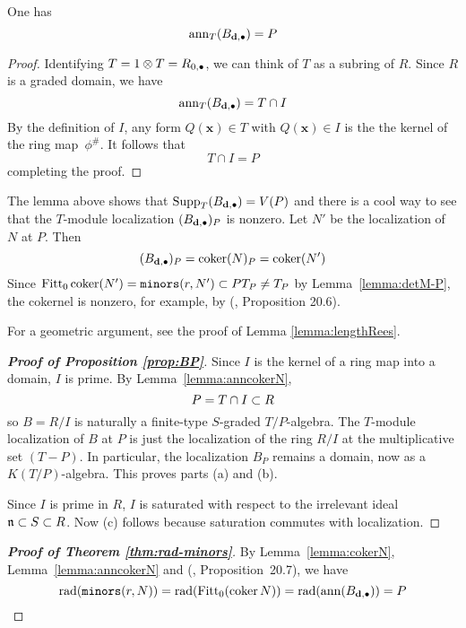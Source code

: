 \documentclass[fleqn,reqno]{amsart}
\begin{document}
\begin{lemma}
\label{lemma:anncokerN}
One has
\[
	\operatorname{ann}_T (B_{\mathbf d,\bullet})=P
\]
\end{lemma}

\begin{proof}
Identifying $T=1\otimes T=R_{0,\bullet}$, we can think of $T$ as a subring of $R$.
Since $R$ is a graded domain, we have
\[
	\operatorname{ann}_T(B_{\mathbf d,\bullet})=T\cap I
\]
By the definition of $I$, any form $Q(\mathbf x)\in T$ with $Q(\mathbf x)\in I$ is the the kernel
of the ring map~$\phi^\#$. It follows that
\[
	T\cap I=P
\]
completing the proof.
\end{proof}

\begin{remarkhint}
The lemma above shows that $\operatorname{Supp}_T (B_{\mathbf d,\bullet})=V(P)$ and there is a cool way
to see that the $T$-module localization $(B_{\mathbf d,\bullet})_P$ is nonzero.
Let $N'$ be the localization of $N$ at $P$.
Then 
\[
	(B_{\mathbf d,\bullet})_P=\operatorname{coker}(N)_P=\operatorname{coker}(N')
\]
Since $\operatorname{Fitt}_0\operatorname{coker}(N')=\mathop{\tt minors}(r,N')\subset PT_P\neq T_P$ by Lemma~\ref{lemma:detM-P},
the cokernel is nonzero, for example, by (\citet{Eis95}, Proposition 20.6).

For a geometric argument, see the proof of Lemma \ref{lemma:lengthRees}.
\end{remarkhint}

\begin{proof}[\bf Proof of Proposition \ref{prop:BP}]
Since $I$ is the kernel of a ring map into a domain, $I$ is prime.
By Lemma~\ref{lemma:anncokerN},
\[
	P=T\cap I\subset R
\]
so $B=R/I$ is naturally a finite-type $S$-graded $T/P$-algebra.
The $T$-module localization of $B$ at $P$ is just
the localization of the ring $R/I$ at the multiplicative set $(T-P)$.
In particular, the localization $B_P$ remains a domain,
now as a $K(T/P)$-algebra.
This proves parts (a) and (b).

Since $I$ is prime in $R$, $I$ is saturated with respect to the irrelevant ideal $\mathfrak{n}\subset S\subset R$.
Now (c) follows because saturation commutes with localization.
\end{proof}

\begin{proof}[\bf Proof of Theorem \ref{thm:rad-minors}]
By Lemma~\ref{lemma:cokerN}, Lemma~\ref{lemma:anncokerN} and
(\citet{Eis95}, Proposition~20.7),
we have
\[
	\operatorname{rad}(\mathop{\tt minors}(r,N))=\operatorname{rad}(\operatorname{Fitt}_0(\operatorname{coker} N))=\operatorname{rad}(\operatorname{ann} (B_{\mathbf d,\bullet}))=P\qedhere
\]
\end{proof}
\end{document}
